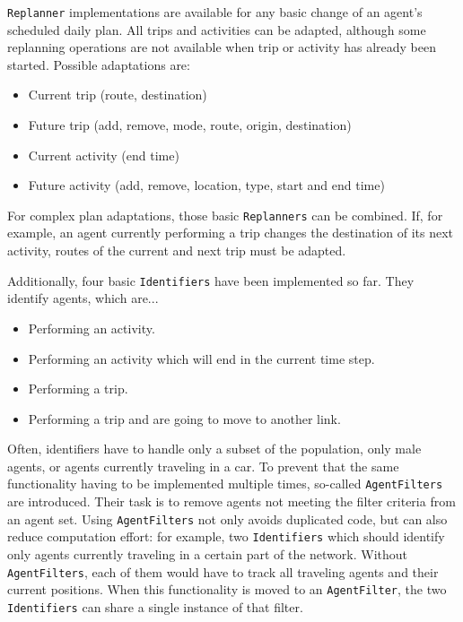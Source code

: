 \lstinline{Replanner} implementations are available for any basic change of an agent's scheduled daily plan. All trips and activities can be adapted, although some replanning operations are not available when trip or activity has already been started. Possible adaptations are:
\begin{itemize}\styleItemize
    \item Current trip (route, destination)
    \item Future trip (add, remove, mode, route, origin, destination)
    \item Current activity (end time)
    \item Future activity (add, remove, location, type, start and end time)
\end{itemize}
%
For complex plan adaptations, those basic \lstinline{Replanners} can be combined. If, for example, an agent currently performing a trip changes the destination of its next activity, routes of the current and next trip must be adapted.
%

Additionally, four basic \lstinline{Identifiers} have been implemented so far. They identify agents, which are...
\begin{itemize}\styleItemize
    \item Performing an activity.
    \item Performing an activity which will end in the current time step.
    \item Performing a trip.
    \item Performing a trip and are going to move to another link.
\end{itemize}
%

Often, identifiers have to handle only a subset of the population, \eg only male agents, or agents currently traveling in a car. To prevent that the same functionality having to be implemented multiple times, so-called \lstinline{AgentFilters} are introduced. Their task is to remove agents not meeting the filter criteria from an agent set. Using \lstinline{AgentFilters} not only avoids duplicated code, but can also reduce computation effort: for example, two \lstinline{Identifiers} which should identify only agents currently traveling in a certain part of the network. Without \lstinline{AgentFilters}, each of them would have to track all traveling agents and their current positions. When this functionality is moved to an \lstinline{AgentFilter}, the two \lstinline{Identifiers} can share a single instance of that filter.
%

